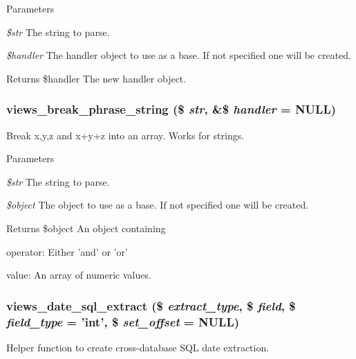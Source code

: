 \begin{DoxyParams}{Parameters}
\item[{\em \$str}]The string to parse. \item[{\em \$handler}]The handler object to use as a base. If not specified one will be created.\end{DoxyParams}
\begin{DoxyReturn}{Returns}
\$handler The new handler object. 
\end{DoxyReturn}
\hypertarget{handlers_8inc_a6f75075f134aec561d058af4949a2602}{
\subsubsection[{views\_\-break\_\-phrase\_\-string}]{\setlength{\rightskip}{0pt plus 5cm}views\_\-break\_\-phrase\_\-string (\$ {\em str}, \/  \&\$ {\em handler} = {\ttfamily NULL})}}
\label{handlers_8inc_a6f75075f134aec561d058af4949a2602}
Break x,y,z and x+y+z into an array. Works for strings.


\begin{DoxyParams}{Parameters}
\item[{\em \$str}]The string to parse. \item[{\em \$object}]The object to use as a base. If not specified one will be created.\end{DoxyParams}
\begin{DoxyReturn}{Returns}
\$object An object containing
\begin{DoxyItemize}
\item operator: Either 'and' or 'or'
\item value: An array of numeric values. 
\end{DoxyItemize}
\end{DoxyReturn}
\hypertarget{handlers_8inc_add4a1d7bb4ea764872603f9f56afaab1}{
\subsubsection[{views\_\-date\_\-sql\_\-extract}]{\setlength{\rightskip}{0pt plus 5cm}views\_\-date\_\-sql\_\-extract (\$ {\em extract\_\-type}, \/  \$ {\em field}, \/  \$ {\em field\_\-type} = {\ttfamily 'int'}, \/  \$ {\em set\_\-offset} = {\ttfamily NULL})}}
\label{handlers_8inc_add4a1d7bb4ea764872603f9f56afaab1}
Helper function to create cross-\/database SQL date extraction.


